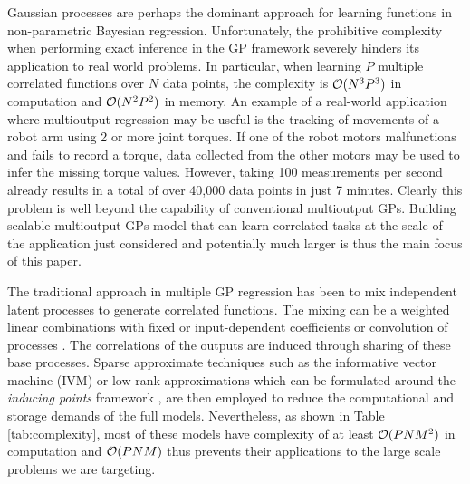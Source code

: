 Gaussian processes \citep[GPs,][]{rasmussen-williams-book} are perhaps the dominant approach for learning functions in non-parametric Bayesian regression.
Unfortunately, the prohibitive complexity when performing exact inference in the GP framework severely hinders its application to real world problems. 
In particular, when learning $P$ multiple correlated functions over $N$ data points, the complexity is $\mathcal{O}(N^3P^3)$ in computation and $\mathcal{O}(N^2P^2)$ in memory.
An example of a real-world application where multioutput regression may be useful is the tracking of  movements of a robot arm using 2 or more joint torques. 
If one of the robot motors malfunctions and fails to record a torque, data collected from the other motors may be used to infer the missing torque values.
However, taking 100 measurements per second already results in a total of over 40,000 data points in just 7 minutes.
Clearly this problem is well beyond the capability of conventional multioutput GPs.
Building scalable multioutput GPs model that can learn correlated tasks at the scale of the application just considered and potentially much larger is thus the main focus of this paper.

The traditional approach in multiple GP regression has been to mix independent latent processes to generate correlated functions.
The mixing can be a weighted linear combinations with fixed \citep{teh-et-al-aistats-05,bonilla-et-al-nips-08} or input-dependent \citep{wilson-et-al-icml-12,nguyen2013efficient} coefficients or convolution of processes \citep{boyle-frean-nips-05,alvarez-lawrence-nips-08}.
The correlations of the outputs are induced through sharing of these base processes.
Sparse approximate techniques such as the informative vector machine (IVM) \cite{lawrence2002fast} or low-rank approximations which can be formulated around the \emph{inducing points} framework \citep{quinonero2005unifying},
are then employed to reduce the computational and storage demands of the full models.
Nevertheless, as shown in Table \ref{tab:complexity}, most of these models have complexity of at least $\mathcal{O}(PNM^2)$ in computation and $\mathcal{O}(PNM)$ thus prevents their applications to the  large scale problems we are targeting.

